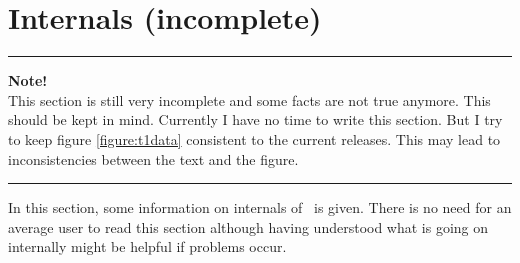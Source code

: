 
\newpage
\section{Internals (incomplete)}
\label{internals}%
\vskip1cm
\hrule
\vskip0.5cm
\begin{center}
\sffamily\large
{\Huge\bfseries Note!}\\
This section is still very incomplete and some facts are not true
anymore. This should be kept in mind. Currently I have no time to
write this section. But I try to keep figure \ref{figure:t1data}
consistent to the current releases. This may lead to inconsistencies
between the text and the figure. 
\end{center}
\hrule
\vskip1cm
In this section, some information on internals of \tonelib\ is given. There is
no need for an average user to read this section although having understood
what is going on internally might be helpful if problems occur. 

